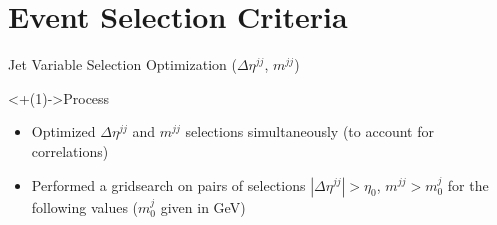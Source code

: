 \documentclass[]{beamer}
\begin{document}
%
%
\section{Event Selection Criteria}

\begin{frame}{Jet Variable Selection Optimization ($\Delta \eta^{jj}$, $m^{jj}$)}
    \begin{block}<+(1)->{Process}
        \begin{itemize}[<+(1)->]
            \item Optimized $\Delta \eta^{jj}$ and $m^{jj}$ selections simultaneously (to account for correlations)
            \item Performed a gridsearch on pairs of selections $|\Delta \eta^{jj}| > \eta_0$, $m^{jj} > m^j_0$ for the following values ($m^j_0$ given in GeV)
            
            \smallskip
            

\end{itemize}
\end{block}
\end{frame}
\end{document}
